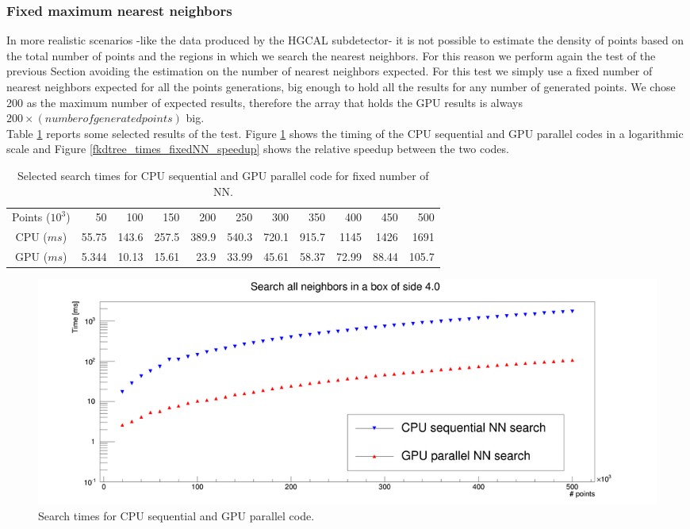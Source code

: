 \subsubsection{Fixed maximum nearest neighbors}
In more realistic scenarios -like the data produced by the HGCAL subdetector- it is not possible to estimate the density of points based on the total number of points and the regions in which we search the nearest neighbors. For this reason we perform again the test of the previous Section avoiding the estimation on the number of nearest neighbors expected. For this test we simply use a fixed number of nearest neighbors expected for all the points generations, big enough to hold all the results for any number of generated points. We chose 200 as the maximum number of expected results, therefore the array that holds the GPU results is always $200 \times (number of generated points)$ big.\\
Table \ref{fkdtree_times_fixedNN_tab} reports some selected results of the test. Figure \ref{fkdtree_times_fixedNN_searches} shows the timing of the CPU sequential and GPU parallel codes in a logarithmic scale and Figure \ref{fkdtree_times_fixedNN_speedup} shows the relative speedup between the two codes.\\

\begin{center}
\begin{table}[h]
\begin{tabular}{ c || r r r r r r r r r r }
Points ($10^{3}$) & 50 & 100 & 150 & 200 & 250 & 300 & 350 & 400 & 450 & 500 \\
CPU ($\unit{ms}$) & 55.75 & 143.6 & 257.5 & 389.9 & 540.3 & 720.1 & 915.7 & 1145 & 1426 & 1691 \\
GPU ($\unit{ms}$) & 5.344 & 10.13 & 15.61 & 23.9 & 33.99 & 45.61 & 58.37 & 72.99 & 88.44 & 105.7 \\
\end{tabular}
\caption{Selected search times for CPU sequential and GPU parallel code for fixed number of NN.}
\label{fkdtree_times_fixedNN_tab}
\end{table}
\end{center}

\begin{figure}
\includegraphics[width=\textwidth]{fkdtree/fixed200/fkdSearchTimes.png}
\caption{Search times for CPU sequential and GPU parallel code.}
\label{fkdtree_times_fixedNN_searches}
\end{figure}

